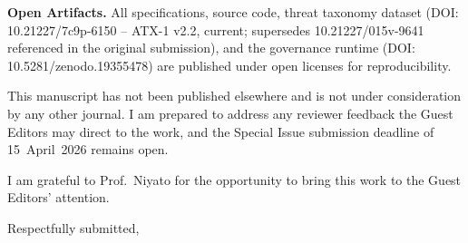 \documentclass[11pt]{letter}
\begin{document}
\begin{letter}
\textbf{Open Artifacts.} All specifications, source code, threat taxonomy dataset (DOI: 10.21227/7c9p-6150 -- ATX-1 v2.2, current; supersedes 10.21227/015v-9641 referenced in the original submission), and the governance runtime (DOI: 10.5281/zenodo.19355478) are published under open licenses for reproducibility.

This manuscript has not been published elsewhere and is not under consideration by any other journal. I am prepared to address any reviewer feedback the Guest Editors may direct to the work, and the Special Issue submission deadline of 15~April~2026 remains open.

I am grateful to Prof.\ Niyato for the opportunity to bring this work to the Guest Editors' attention.

\closing{Respectfully submitted,}

\end{letter}
\end{document}
